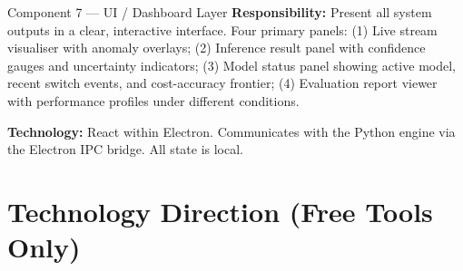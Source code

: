 \documentclass[11pt, a4paper]{article}
\begin{document}
\begin{infobox}{Component 7 — UI / Dashboard Layer}
\textbf{Responsibility:} Present all system outputs in a clear, interactive interface.
Four primary panels: (1) Live stream visualiser with anomaly overlays;
(2) Inference result panel with confidence gauges and uncertainty indicators;
(3) Model status panel showing active model, recent switch events, and cost-accuracy frontier;
(4) Evaluation report viewer with performance profiles under different conditions.

\textbf{Technology:} React within Electron. Communicates with the Python engine
via the Electron IPC bridge. All state is local.
\end{infobox}

\section{Technology Direction (Free Tools Only)}
\end{document}
